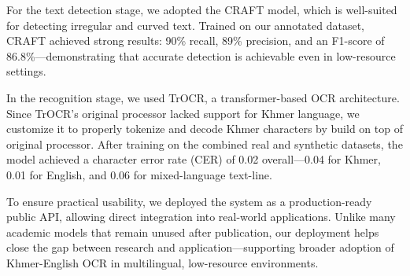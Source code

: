 \begin{adjustwidth}{0.2cm}{0.2cm}
    For the text detection stage, we adopted the CRAFT model, which 
    is well-suited for detecting irregular and curved text. Trained 
    on our annotated dataset, CRAFT achieved strong results: 90\% 
    recall, 89\% precision, and an F1-score of 86.8\%—demonstrating 
    that accurate detection is achievable even in low-resource 
    settings.

    In the recognition stage, we used TrOCR, a transformer-based 
    OCR architecture. Since TrOCR’s original processor lacked 
    support for Khmer language, we customize it to properly tokenize 
    and decode Khmer characters by build on top of original 
    processor. After training on the combined real and synthetic 
    datasets, the model achieved a character error rate (CER) of 
    0.02 overall—0.04 for Khmer, 0.01 for English, and 0.06 for 
    mixed-language text-line.

    To ensure practical usability, we deployed the system as a 
    production-ready public API, allowing direct integration into 
    real-world applications. Unlike many academic models that 
    remain unused after publication, our deployment helps close 
    the gap between research and application—supporting broader 
    adoption of Khmer-English OCR in multilingual, low-resource 
    environments.



    
    \end{adjustwidth}